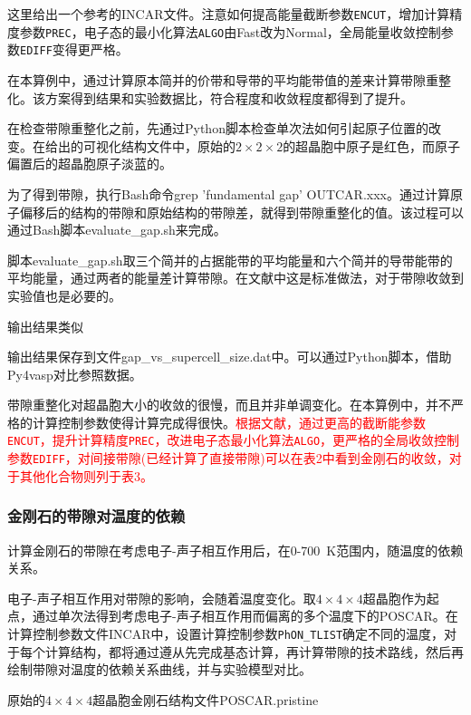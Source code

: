 {这里给出一个参考的\textrm{INCAR文件}。注意如何提高能量截断参数\texttt{ENCUT}，增加计算精度参数\texttt{PREC}，电子态的最小化算法\texttt{ALGO}由\textrm{Fast}改为\textrm{Normal}，全局能量收敛控制参数\texttt{EDIFF}变得更严格。

在本算例中，通过计算原本简并的价带和导带的平均能带值的差来计算带隙重整化。该方案得到结果和实验数据比，符合程度和收敛程度都得到了提升。

在检查带隙重整化之前，先通过\textrm{Python}脚本检查单次法如何引起原子位置的改变。在给出的可视化结构文件中，原始的$2\times2\times2$的超晶胞中原子是红色，而原子偏置后的超晶胞原子淡蓝的。

为了得到带隙，执行\textrm{Bash}命令\textrm{grep 'fundamental gap' OUTCAR.xxx}。通过计算原子偏移后的结构的带隙和原始结构的带隙差，就得到带隙重整化的值。该过程可以通过\textrm{Bash}脚本\textrm{evaluate\_gap.sh}来完成。

脚本\textrm{evaluate\_gap.sh}取三个简并的占据能带的平均能量和六个简并的导带能带的平均能量，通过两者的能量差计算带隙。在文献中这是标准做法，对于带隙收敛到实验值也是必要的。

输出结果类似

输出结果保存到文件\textrm{gap\_vs_supercell\_size.dat}中。可以通过\textrm{Python}脚本，借助\textrm{Py4vasp}对比参照数据。

带隙重整化对超晶胞大小的收敛的很慢，而且并非单调变化。在本算例中，并不严格的计算控制参数使得计算完成得很快。\textcolor{red}{根据文献\cite{NJP20-123008_2018}，通过更高的截断能参数\texttt{ENCUT}，提升计算精度\texttt{PREC}，改进电子态最小化算法\texttt{ALGO}，更严格的全局收敛控制参数\texttt{EDIFF}，对间接带隙(已经计算了直接带隙)可以在表2中看到金刚石的收敛，对于其他化合物则列于表3。}

\subsubsection{金刚石的带隙对温度的依赖}
计算金刚石的带隙在考虑电子-声子相互作用后，在\textrm{0-700~K}范围内，随温度的依赖关系。

电子-声子相互作用对带隙的影响，会随着温度变化。取$4\times4\times4$超晶胞作为起点，通过单次法得到考虑电子-声子相互作用而偏离的多个温度下的\textrm{POSCAR}。在计算控制参数文件\textrm{INCAR}中，设置计算控制参数\texttt{PhON\_TLIST}确定不同的温度，对于每个计算结构，都将通过遵从先完成基态计算，再计算带隙的技术路线，然后再绘制带隙对温度的依赖关系曲线，并与实验模型对比。

原始的$4\times4\times4$超晶胞金刚石结构文件\textrm{POSCAR.pristine}

}
